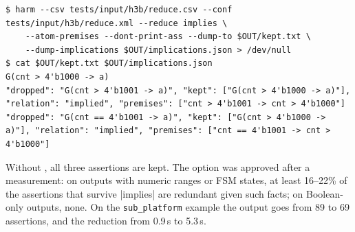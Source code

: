 \begin{lstlisting}
$ harm --csv tests/input/h3b/reduce.csv --conf tests/input/h3b/reduce.xml --reduce implies \
    --atom-premises --dont-print-ass --dump-to $OUT/kept.txt \
    --dump-implications $OUT/implications.json > /dev/null
$ cat $OUT/kept.txt $OUT/implications.json
G(cnt > 4'b1000 -> a)
"dropped": "G(cnt > 4'b1001 -> a)", "kept": ["G(cnt > 4'b1000 -> a)"], "relation": "implied", "premises": ["cnt > 4'b1001 -> cnt > 4'b1000"]
"dropped": "G(cnt == 4'b1001 -> a)", "kept": ["G(cnt > 4'b1000 -> a)"], "relation": "implied", "premises": ["cnt == 4'b1001 -> cnt > 4'b1000"]
\end{lstlisting}
Without \opt{atom-premises}, all three assertions are kept. The option was approved after a measurement: on outputs with numeric ranges or FSM states, at least 16--22\% of the assertions that survive \code|implies| are redundant given such facts; on Boolean-only outputs, none. On the \texttt{sub\_platform} example the output goes from 89 to 69 assertions, and the reduction from 0.9\,s to 5.3\,s.
